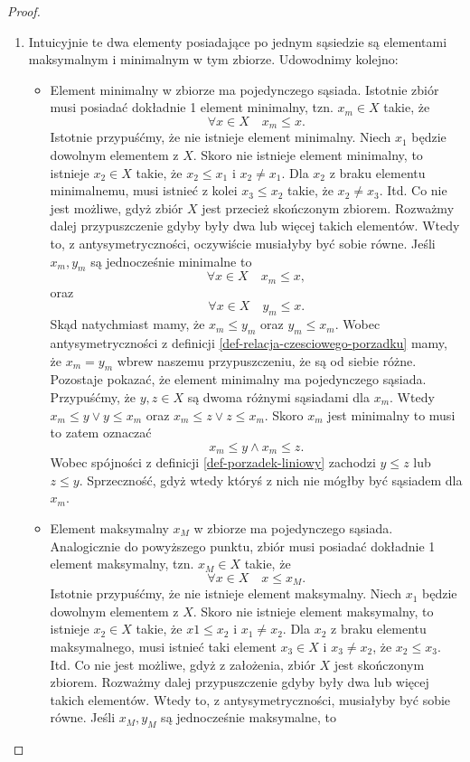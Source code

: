 \documentclass[12pt,a4paper]{report}
\begin{document}
\begin{proof}
\begin{enumerate}
\item Intuicyjnie te dwa elementy posiadające po jednym sąsiedzie są elementami maksymalnym i minimalnym w tym zbiorze. Udowodnimy kolejno:
\begin{itemize}
\item Element minimalny w zbiorze ma pojedynczego sąsiada. Istotnie zbiór musi posiadać dokładnie 1 element minimalny, tzn. $x_m \in X$ takie, że 
$$
\forall x \in X \quad x_m \leq x.
$$
Istotnie przypuśćmy, że nie istnieje element minimalny. Niech $x_1$ będzie dowolnym elementem z $X$. Skoro nie istnieje element minimalny, to istnieje $x_2 \in X$ takie, że $x_2 \leq x_1$ i $x_2 \neq x_1$. Dla $x_2$ z braku elementu minimalnemu, musi istnieć z kolei $x_3 \leq x_2$ takie, że $x_2 \neq x_3$. Itd. Co nie jest możliwe, gdyż zbiór $X$ jest przecież skończonym zbiorem.
Rozważmy dalej przypuszczenie gdyby były dwa lub więcej takich elementów. Wtedy to, z antysymetryczności, oczywiście musiałyby być sobie równe. Jeśli $x_m, y_m$ są jednocześnie minimalne to
$$
\forall x \in X \quad x_m \leq x,
$$
oraz 
$$
\forall x \in X \quad y_m \leq x.
$$
Skąd natychmiast mamy, że $ x_m \leq y_m$ oraz $y_m \leq x_m$. Wobec antysymetryczności z definicji \ref{def-relacja-czesciowego-porzadku} mamy, że $x_m = y_m$ wbrew naszemu przypuszczeniu, że są od siebie różne.
Pozostaje pokazać, że element minimalny ma pojedynczego sąsiada. Przypuśćmy, że $y,z \in X$ są dwoma różnymi sąsiadami dla $x_m$. Wtedy $ x_m \leq y \lor y \leq x_m$ oraz $ x_m \leq z \lor z \leq x_m$. Skoro $x_m$ jest minimalny to musi to zatem oznaczać
$$
x_m \leq y \land x_m \leq z.
$$ 
Wobec spójności z definicji \ref{def-porzadek-liniowy} zachodzi $y \leq z$ lub $z \leq y$. Sprzeczność, gdyż wtedy któryś z nich nie mógłby być sąsiadem dla $x_m$.
\item Element maksymalny $x_M$ w zbiorze ma pojedynczego sąsiada. Analogicznie do powyższego punktu, zbiór musi posiadać dokładnie 1 element maksymalny, tzn. $x_M \in X$ takie, że
$$\forall x \in X \quad x \leq x_M.$$
Istotnie przypuśćmy, że nie istnieje element maksymalny. Niech $x_1$ będzie dowolnym elementem z $X$. Skoro nie istnieje element maksymalny, to istnieje $x_2 \in X$ takie, że $x1 \leq x_2$ i $x_1 \neq x_2$. Dla $x_2$ z braku elementu maksymalnego, musi istnieć taki element $x_3 \in X$ i $x_3 \neq x_2$, że $x_2 \leq x_3$. Itd. Co nie jest możliwe, gdyż z założenia, zbiór $X$ jest skończonym zbiorem.
Rozważmy dalej przypuszczenie gdyby były dwa lub więcej takich elementów. Wtedy to, z antysymetryczności, musiałyby być sobie równe. Jeśli $x_M, y_M$ są jednocześnie maksymalne, to 

\end{itemize}
\end{enumerate}
\end{proof}
\end{document}
